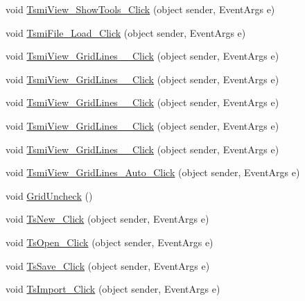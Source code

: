 \begin{DoxyCompactItemize}
\item 
void \mbox{\hyperlink{class_paint___program_1_1_form1_aa2e74c2cba3ed25148c8233b4cdf9534}{Tsmi\+View\+\_\+\+Show\+Tools\+\_\+\+Click}} (object sender, Event\+Args e)
\item 
void \mbox{\hyperlink{class_paint___program_1_1_form1_ae97d925efefbb28724feae4ac62f3969}{Tsmi\+File\+\_\+\+Load\+\_\+\+Click}} (object sender, Event\+Args e)
\item 
void \mbox{\hyperlink{class_paint___program_1_1_form1_ab504b6a4767e30549d06c4e4816fabae}{Tsmi\+View\+\_\+\+Grid\+Lines\+\_\+\_\+\+Click}} (object sender, Event\+Args e)
\item 
void \mbox{\hyperlink{class_paint___program_1_1_form1_adb0b989f2e72eb718d5a7189484ac4c6}{Tsmi\+View\+\_\+\+Grid\+Lines\+\_\+\_\+\+Click}} (object sender, Event\+Args e)
\item 
void \mbox{\hyperlink{class_paint___program_1_1_form1_ad1220fb8f568478e58db7e778fce5c37}{Tsmi\+View\+\_\+\+Grid\+Lines\+\_\+\_\+\+Click}} (object sender, Event\+Args e)
\item 
void \mbox{\hyperlink{class_paint___program_1_1_form1_a9488136e6f66de4b3e7cdf54659bfe20}{Tsmi\+View\+\_\+\+Grid\+Lines\+\_\+\_\+\+Click}} (object sender, Event\+Args e)
\item 
void \mbox{\hyperlink{class_paint___program_1_1_form1_a777afbe5c0f7d7654f4f4a0962d0feea}{Tsmi\+View\+\_\+\+Grid\+Lines\+\_\+\_\+\+Click}} (object sender, Event\+Args e)
\item 
void \mbox{\hyperlink{class_paint___program_1_1_form1_a833a4da8414e842babafe6a034f2919f}{Tsmi\+View\+\_\+\+Grid\+Lines\+\_\+\+Auto\+\_\+\+Click}} (object sender, Event\+Args e)
\item 
void \mbox{\hyperlink{class_paint___program_1_1_form1_a2531d9adc858d169c9d5ae28f5f37167}{Grid\+Uncheck}} ()
\item 
void \mbox{\hyperlink{class_paint___program_1_1_form1_ae896493468ffcf8b621a014f6a0553a3}{Ts\+New\+\_\+\+Click}} (object sender, Event\+Args e)
\item 
void \mbox{\hyperlink{class_paint___program_1_1_form1_adf420684ede06a8c00802959aa1959e9}{Ts\+Open\+\_\+\+Click}} (object sender, Event\+Args e)
\item 
void \mbox{\hyperlink{class_paint___program_1_1_form1_a4e1485fafb2460d9e028a6fb3c8494e0}{Ts\+Save\+\_\+\+Click}} (object sender, Event\+Args e)
\item 
void \mbox{\hyperlink{class_paint___program_1_1_form1_a4748a20826e99235f5fa467335383da4}{Ts\+Import\+\_\+\+Click}} (object sender, Event\+Args e)

\end{DoxyCompactItemize}

